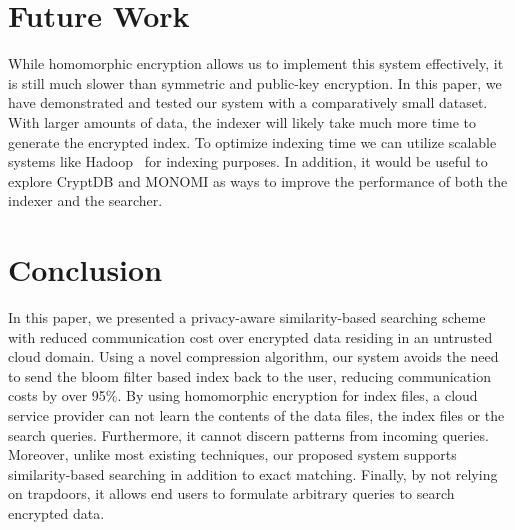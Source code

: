 \section{Future Work}
\label{sec:futurework}

While homomorphic encryption allows us to implement this system effectively, 
it is still much slower than symmetric and public-key encryption.
In this paper, we have demonstrated and tested our system with a comparatively 
small dataset. With larger amounts of data, the indexer will likely take 
much more time to generate the
encrypted index. To optimize indexing time we can
utilize scalable systems like Hadoop~\cite{hadoop} for indexing
purposes. In addition, it would be useful to explore CryptDB and MONOMI as
ways to improve the performance of both the indexer and the searcher.

\section{Conclusion}
\label{sec:conclusion}

In this paper, we presented a privacy-aware similarity-based searching scheme
with reduced communication cost over encrypted data residing in an untrusted
cloud domain. Using a novel compression 
algorithm, our system avoids the need to send the bloom filter based index back to the 
user, reducing communication costs by over 95\%.
By using homomorphic encryption for index files, a cloud service provider can not 
learn the contents of 
the data files, the index files or the search queries. Furthermore, it cannot 
discern patterns from incoming queries. Moreover, unlike most existing techniques, our
proposed system supports similarity-based searching in addition to exact matching.
Finally, by not relying on trapdoors, it allows end users to formulate
arbitrary queries to search encrypted data.
